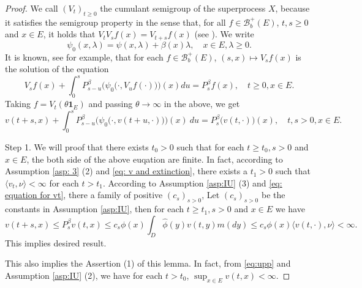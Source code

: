 \documentclass[12pt,a4paper]{amsart}
\theoremstyle{plain}
\theoremstyle{definition}
\numberwithin{equation}{section}
\begin{document}
\begin{proof}
	We call $(V_t)_{t\geq 0}$ the cumulant semigroup of the superprocess $X$, because it satisfies the semigroup property in the sense that,
for all $f\in \mathcal B_b^+(E)$,
$t,s \geq 0$ and $x\in E$, it holds that $V_tV_sf(x) = V_{t+s}f(x)$ (see \cite[Theorem 2.21]{Li2011Measure-valued}).
	We write
\[
	\psi_0(x,\lambda) = \psi(x,\lambda)+ \beta(x) \lambda,
	\quad x\in E, \lambda \geq 0.
\]
It is known, see \cite[Theorem 2.23]{Li2011Measure-valued} for example, that
for each $f \in \mathcal B_b^+(E)$,
$(s,x)\mapsto V_sf(x)$ is the solution of the equation
\[
	V_sf(x) + \int_0^s P_{s-u}^\beta \Big(\psi_0\big(\cdot,V_u f(\cdot)\big)\Big)(x)du = P_s^\beta f(x),
	\quad t\geq 0, x\in E.
\]
	Taking $f = V_t(\theta \mathbf 1_E)$ and passing $\theta \to \infty$ in the above, we get
\begin{equation}
\label{eq: equation for vt}
	v(t+s,x) + \int_0^sP^\beta_{s-u}\Big(\psi_0\big(\cdot, v(t+u,\cdot)\big)\Big)(x)~du
	=P^\beta_s\big(v(t,\cdot)\big)(x),
	\quad t,s > 0, x\in E.
\end{equation}

	Step 1.
	We will proof that there exists $t_0 >0$ such that for each $t\geq t_0, s> 0$ and $x \in E$, the both side of the above euqation are finite.
	In fact, according to Assumption \ref{asp: 3} (2) and \eqref{eq: v and extinction}, there exists a $t_1 > 0$ such that $\langle v_t, \nu\rangle < \infty $ for each $t>t_1$.
	According to Assumption \ref{asp:IU} (3) and \eqref{eq: equation for vt}, 
	there a family of positive $(c_s)_{s>0}$, 
	Let $(c_s)_{s>0}$ be the constants in Assumption \ref{asp:IU}, then for each $t \geq t_1,s>0$ and $x\in E$ we have
\begin{equation}
\label{eq:upp}
	v(t+s,x) \leq P^{\beta}_sv(t,x)\leq c_s\phi(x)\int_D\hat\phi(y)v(t,y)m(dy)\leq c_s\phi(x)\langle v(t,\cdot),\nu\rangle< \infty.
\end{equation}
	This implies desired result.

	This also implies the Assertion (1) of this lemma. In fact, from \eqref{eq:upp} and Assumption \ref{asp:IU} (2), we have for each $t>t_0$, $\sup_{x\in E}v(t,x) < \infty$.


\end{proof}
\end{document}
